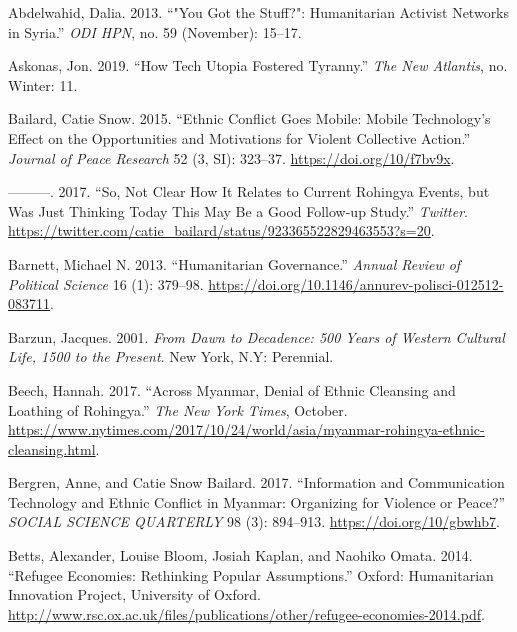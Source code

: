 \hypertarget{refs}{}
\begin{cslreferences}
\leavevmode\hypertarget{ref-Abdelwahid2013You}{}%
Abdelwahid, Dalia. 2013. ``"You Got the Stuff?": Humanitarian Activist
Networks in Syria.'' \emph{ODI HPN}, no. 59 (November): 15--17.

\leavevmode\hypertarget{ref-Askonas2019How}{}%
Askonas, Jon. 2019. ``How Tech Utopia Fostered Tyranny.'' \emph{The New
Atlantis}, no. Winter: 11.

\leavevmode\hypertarget{ref-Bailard2015Ethnic}{}%
Bailard, Catie Snow. 2015. ``Ethnic Conflict Goes Mobile: Mobile
Technology's Effect on the Opportunities and Motivations for Violent
Collective Action.'' \emph{Journal of Peace Research} 52 (3, SI):
323--37. \url{https://doi.org/10/f7bv9x}.

\leavevmode\hypertarget{ref-Bailard2017So}{}%
---------. 2017. ``So, Not Clear How It Relates to Current Rohingya
Events, but Was Just Thinking Today This May Be a Good Follow-up
Study.'' \emph{Twitter}.
\url{https://twitter.com/catie_bailard/status/923365522829463553?s=20}.

\leavevmode\hypertarget{ref-Barnett2013Humanitarian}{}%
Barnett, Michael N. 2013. ``Humanitarian Governance.'' \emph{Annual
Review of Political Science} 16 (1): 379--98.
\url{https://doi.org/10.1146/annurev-polisci-012512-083711}.

\leavevmode\hypertarget{ref-Barzun2001From}{}%
Barzun, Jacques. 2001. \emph{From Dawn to Decadence: 500 Years of
Western Cultural Life, 1500 to the Present}. New York, N.Y: Perennial.

\leavevmode\hypertarget{ref-Beech2017Across}{}%
Beech, Hannah. 2017. ``Across Myanmar, Denial of Ethnic Cleansing and
Loathing of Rohingya.'' \emph{The New York Times}, October.
\url{https://www.nytimes.com/2017/10/24/world/asia/myanmar-rohingya-ethnic-cleansing.html}.

\leavevmode\hypertarget{ref-Bergren2017Information}{}%
Bergren, Anne, and Catie Snow Bailard. 2017. ``Information and
Communication Technology and Ethnic Conflict in Myanmar: Organizing for
Violence or Peace?'' \emph{SOCIAL SCIENCE QUARTERLY} 98 (3): 894--913.
\url{https://doi.org/10/gbwhb7}.

\leavevmode\hypertarget{ref-Betts2014Refugee}{}%
Betts, Alexander, Louise Bloom, Josiah Kaplan, and Naohiko Omata. 2014.
``Refugee Economies: Rethinking Popular Assumptions.'' Oxford:
Humanitarian Innovation Project, University of Oxford.
\url{http://www.rsc.ox.ac.uk/files/publications/other/refugee-economies-2014.pdf}.


\end{cslreferences}
